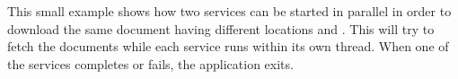 \documentclass{ozdoc}
\begin{document}



This small example shows how two services can be started in parallel in order to download the same document having different locations  and . This will try to fetch the documents while each service runs within its own thread. When one of the services completes or fails, the application exits. \mozartEMPTY
 \mozartEMPTY
 


 \mozartEMPTY
\begin{mozartCODEDISPLAY}\mozartFACETEXT{\mozartNEWLINE
}\mozartFACETEXT{\mozartSPACE{}}\mozartFACETEXT{\mozartSPACE{}\mozartNEWLINE
}
\end{mozartCODEDISPLAY}
\end{document}

